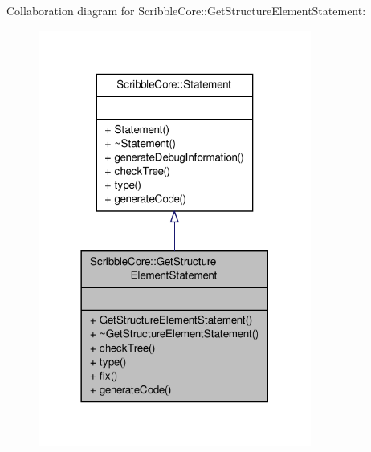 Collaboration diagram for Scribble\-Core\-:\-:Get\-Structure\-Element\-Statement\-:
\nopagebreak
\begin{figure}[H]
\begin{center}
\leavevmode
\includegraphics[width=254pt]{class_scribble_core_1_1_get_structure_element_statement__coll__graph}
\end{center}
\end{figure}
